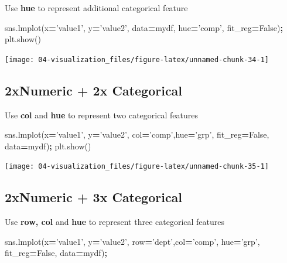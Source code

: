 \documentclass[
]{book}
\newenvironment{Shaded}{\begin{snugshade}}{\end{snugshade}}
\newcommand{\NormalTok}[1]{#1}
\newcommand{\OperatorTok}[1]{\textcolor[rgb]{0.43,0.43,0.43}{\textbf{#1}}}
\newcommand{\StringTok}[1]{\textcolor[rgb]{0.5,0.5,0.5}{#1}}
\newcommand{\VariableTok}[1]{\textcolor[rgb]{0,0,0}{#1}}
\begin{document}
Use \textbf{hue} to represent additional categorical feature

\begin{Shaded}
\begin{Highlighting}[]
\NormalTok{sns.lmplot(x}\OperatorTok{=}\StringTok{'value1'}\NormalTok{, y}\OperatorTok{=}\StringTok{'value2'}\NormalTok{, data}\OperatorTok{=}\NormalTok{mydf, hue}\OperatorTok{=}\StringTok{'comp'}\NormalTok{, fit_reg}\OperatorTok{=}\VariableTok{False}\NormalTok{)}\OperatorTok{;}
\NormalTok{plt.show()}
\end{Highlighting}
\end{Shaded}

\texttt{[image: 04-visualization\_files/figure-latex/unnamed-chunk-34-1]}

\hypertarget{xnumeric-2x-categorical}{%
\subsection{2xNumeric + 2x Categorical}\label{xnumeric-2x-categorical}}

Use \textbf{col} and \textbf{hue} to represent two categorical features

\begin{Shaded}
\begin{Highlighting}[]
\NormalTok{sns.lmplot(x}\OperatorTok{=}\StringTok{'value1'}\NormalTok{, y}\OperatorTok{=}\StringTok{'value2'}\NormalTok{, col}\OperatorTok{=}\StringTok{'comp'}\NormalTok{,hue}\OperatorTok{=}\StringTok{'grp'}\NormalTok{, fit_reg}\OperatorTok{=}\VariableTok{False}\NormalTok{, data}\OperatorTok{=}\NormalTok{mydf)}\OperatorTok{;}
\NormalTok{plt.show()}
\end{Highlighting}
\end{Shaded}

\texttt{[image: 04-visualization\_files/figure-latex/unnamed-chunk-35-1]}

\hypertarget{xnumeric-3x-categorical}{%
\subsection{2xNumeric + 3x Categorical}\label{xnumeric-3x-categorical}}

Use \textbf{row, col} and \textbf{hue} to represent three categorical features

\begin{Shaded}
\begin{Highlighting}[]
\NormalTok{sns.lmplot(x}\OperatorTok{=}\StringTok{'value1'}\NormalTok{, y}\OperatorTok{=}\StringTok{'value2'}\NormalTok{, row}\OperatorTok{=}\StringTok{'dept'}\NormalTok{,col}\OperatorTok{=}\StringTok{'comp'}\NormalTok{, hue}\OperatorTok{=}\StringTok{'grp'}\NormalTok{, fit_reg}\OperatorTok{=}\VariableTok{False}\NormalTok{, data}\OperatorTok{=}\NormalTok{mydf)}\OperatorTok{;}
\end{Highlighting}
\end{Shaded}
\end{document}
